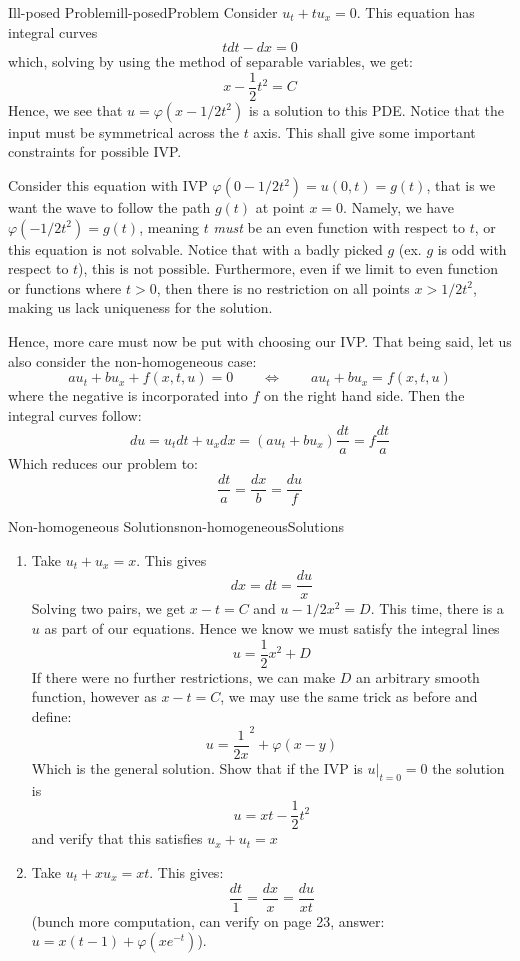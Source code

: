 \documentclass{book}
\renewcommand{\phi}{\varphi}
\newcommand{\LRw}{\Leftrightarrow}
\begin{document}
\begin{example}{Ill-posed Problem}{ill-posedProblem}
	Consider $u_t + tu_x = 0$. This equation has integral curves
	\[
		tdt - dx = 0
	\]
	which, solving by using the method of separable variables, we get:
	\[
		x - \frac{1}{2}t^2 = C
	\]
	Hence, we see that $u = \phi(x - 1/2t^2)$ is a solution to this PDE. Notice that the input must be
	symmetrical across the $t$ axis. This shall give some important constraints for possible IVP.


	Consider this equation with IVP $\phi(0-1/2t^2) = u(0,t) = g(t)$, that is
	we want the wave to follow the path $g(t)$ at point $x = 0$. Namely, we have $\phi(-1/2 t^2) = g(t)$, meaning $t$ \emph{must}
	be an even function with respect to $t$, or this equation is not solvable.
	Notice that with a badly picked $g$ (ex. $g$ is odd with respect to $t$), this is not possible.
	Furthermore, even if we limit to even function or functions where $t > 0$, then there is no
	restriction on all points $x > 1/2t^2$, making us lack uniqueness for the solution.
\end{example}

Hence, more care must now be put with choosing our IVP. That being said, let us also consider the
non-homogeneous case:
\[
	au_t + bu_x + f(x,t,u) = 0 \qquad \LRw \qquad au_t + bu_x = f(x,t,u)
\]
where the negative is incorporated into $f$ on the right hand side. Then the integral curves follow:
\[
	du = u_tdt + u_xdx = (au_t + bu_x)\frac{dt}{a} = f \frac{dt}{a}
\]
Which reduces our problem to:
\[
	\frac{dt}{a} = \frac{dx}{b} = \frac{du}{f}
\]
\begin{example}{Non-homogeneous Solutions}{non-homogeneousSolutions}
	\begin{enumerate}
		\item Take $u_t + u_x = x$. This gives
			\[
				dx = dt = \frac{du}{x}
			\]
			Solving two pairs, we get $x-t = C$ and $u - 1/2 x^2 = D$. This time, there is a $u$ as part
			of our equations. Hence we know we must satisfy the integral lines
			\[
				u = \frac{1}{2}x^2 + D
			\]
			If there were no further restrictions, we can make $D$ an arbitrary smooth function, however
			as $x-t = C$, we may use the same trick as before and define:
			\[
				u = \frac{1}{2x}^2 + \phi(x-y)
			\]
			Which is the general solution. Show that if the IVP is $u|_{t=0} = 0$ the solution is
			\[
				u = xt - \frac{1}{2}t^2
			\]
			and verify that this satisfies $u_x + u_t = x
			$
		\item Take $u_t + xu_x = xt$. This gives:
			\[
				\frac{dt}{1} = \frac{dx}{x} = \frac{du}{xt}
			\]
			(bunch more computation, can verify on page 23, answer: $u = x(t-1) + \phi(xe^{-t})$).
	\end{enumerate}
\end{example}
\end{document}
